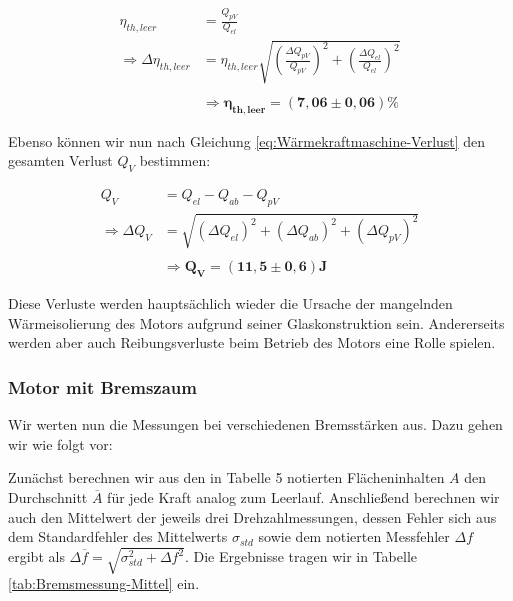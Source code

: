 \documentclass{article}
\begin{document}
\begin{equation}
    \begin{split}
        \eta_{th,leer} &= \frac{Q_{pV}}{Q_{el}} \\
        \Rightarrow \Delta \eta_{th,leer} &= \eta_{th,leer} \sqrt{\left( \frac{\Delta Q_{pV}}{Q_{pV}} \right)^2 + \left( \frac{\Delta Q_{el}}{Q_{el}} \right)^2} \\ \\
        &\Rightarrow \bm{\eta_{th,leer} = (7,06 \pm 0,06)} \%
    \end{split}
\end{equation}

Ebenso können wir nun nach Gleichung \ref{eq:Wärmekraftmaschine-Verlust} den gesamten Verlust $Q_V$ bestimmen:

\begin{equation}
    \begin{split}
        Q_V &= Q_{el} - Q_{ab} - Q_{pV} \\
        \Rightarrow \Delta Q_V &= \sqrt{(\Delta Q_{el})^2 + (\Delta Q_{ab})^2 + (\Delta Q_{pV})^2} \\ \\
        &\Rightarrow \bm{Q_V = (11,5 \pm 0,6)} \textbf{J}
    \end{split}
\end{equation}

Diese Verluste werden hauptsächlich wieder die Ursache der mangelnden Wärmeisolierung des Motors aufgrund seiner Glaskonstruktion sein. Andererseits werden aber auch Reibungsverluste beim Betrieb des Motors eine Rolle spielen.  

\newpage
\subsubsection{Motor mit Bremszaum}

Wir werten nun die Messungen bei verschiedenen Bremsstärken aus. Dazu gehen wir wie folgt vor:

Zunächst berechnen wir aus den in Tabelle 5 notierten Flächeninhalten $A$ den Durchschnitt $\overline{A}$ für jede Kraft analog zum Leerlauf. Anschließend berechnen wir auch den Mittelwert der jeweils drei Drehzahlmessungen, dessen Fehler sich aus dem Standardfehler des Mittelwerts $\sigma_{std}$ sowie dem notierten Messfehler $\Delta f$ ergibt als $\Delta \overline{f} = \sqrt{\sigma_{std}^2 + \Delta f^2}$. Die Ergebnisse tragen wir in Tabelle \ref{tab:Bremsmessung-Mittel} ein. 


\phantom{.}
\end{document}
